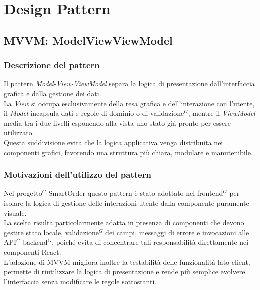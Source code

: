 \section{Design Pattern}
\subsection{MVVM: ModelViewViewModel}
\subsubsection{Descrizione del pattern}
Il pattern \textit{Model-View-ViewModel} separa la logica di presentazione dall'interfaccia grafica e dalla gestione dei dati.\\
La \textit{View} si occupa esclusivamente della resa grafica e dell'interazione con l'utente, il \textit{Model} incapsula dati e regole di dominio o di validazione$^G$, mentre il \textit{ViewModel} media tra i due livelli esponendo alla vista uno stato gi\`a pronto per essere utilizzato.\\
Questa suddivisione evita che la logica applicativa venga distribuita nei componenti grafici, favorendo una struttura pi\`u chiara, modulare e manutenibile.
\subsubsection{Motivazioni dell'utilizzo del pattern}
Nel progetto$^G$ SmartOrder questo pattern \`e stato adottato nel frontend$^G$ per isolare la logica di gestione delle interazioni utente dalla componente puramente visuale.\\
La scelta risulta particolarmente adatta in presenza di componenti che devono gestire stato locale, validazione$^G$ dei campi, messaggi di errore e invocazioni alle API$^G$ backend$^G$, poich\'e evita di concentrare tali responsabilit\`a direttamente nei componenti React.\\
L'adozione di MVVM migliora inoltre la testabilit\`a delle funzionalit\`a lato client, permette di riutilizzare la logica di presentazione e rende pi\`u semplice evolvere l'interfaccia senza modificare le regole sottostanti.
